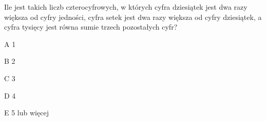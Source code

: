 \begin{tresc}
Ile jest takich liczb czterocyfrowych, w których cyfra dziesiątek jest dwa razy większa od cyfry jedności, cyfra setek jest dwa razy większa od cyfry dziesiątek, a cyfra tysięcy jest równa sumie trzech pozostałych cyfr?
\end{tresc}
\begin{wariant}{A} 1 \end{wariant}
\begin{wariant}{B} 2 \end{wariant}
\begin{wariant}{C} 3 \end{wariant}
\begin{wariant}{D} 4 \end{wariant}
\begin{wariant}{E} 5 lub więcej \end{wariant}
